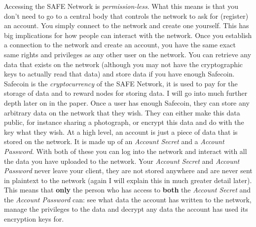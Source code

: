Accessing the SAFE Network is \textit{permission-less}. What this means is that you don't need to go to a central body that controls the network to ask for (register) an account. You simply connect to the network and create one yourself. This has big implications for how people can interact with the network. Once you establish a connection to the network and create an account, you have the same exact same rights and privileges as any other user on the network. You can retrieve any data that exists on the network (although you may not have the cryptographic keys to actually read that data) and store data if you have enough Safecoin. Safecoin is the \textit{cryptocurrency} of the SAFE Network, it is used to pay for the storage of data and to reward nodes for storing data\cite{lambert2015safecoin}. I will go into much further depth later on in the paper. Once a user has enough Safecoin, they can store any arbitrary data on the network that they wish. They can either make this data public, for instance sharing a photograph, or encrypt this data and do with the key what they wish. At a high level, an account is just a piece of data that is stored on the network. It is made up of an \textit{Account Secret} and a \textit{Account Password}. With both of these you can log into the network and interact with all the data you have uploaded to the network. Your \textit{Account Secret} and \textit{Account Password} never leave your client, they are not stored anywhere and are never sent in plaintext to the network (again I will explain this in much greater detail later). This means that \textbf{only} the person who has access to \textbf{both} the \textit{Account Secret} and the \textit{Account Password} can: see what data the account has written to the network, manage the privileges to the data and decrypt any data the account has used its encryption keys for.

